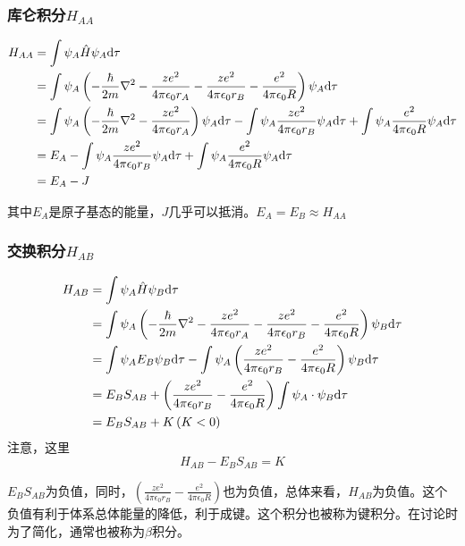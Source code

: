 \subsubsection{库仑积分$H_{AA}$}

\begin{align*}
    H_{AA} &= \int \psi_A \hat{H} \psi_A \mathrm{d} \tau \\ 
    &= \int \psi_A \left( -\frac{\hbar}{2m} \nabla^2 - \frac{ze^2}{4\pi\epsilon_0r_A} - \frac{ze^2}{4\pi\epsilon_0r_B} -  \frac{e^2}{4\pi\epsilon_0R}  \right) \psi_A \mathrm{d} \tau \\
    &= \int \psi_A \left( -\frac{\hbar}{2m} \nabla^2 - \frac{ze^2}{4\pi\epsilon_0r_A} \right) \psi_A \mathrm{d} \tau  - \int \psi_A \frac{ze^2}{4\pi\epsilon_0r_B} \psi_A \mathrm{d} \tau + \int \psi_A  \frac{e^2}{4\pi\epsilon_0R} \psi_A \mathrm{d} \tau \\
    &= E_A - \int \psi_A \frac{ze^2}{4\pi\epsilon_0r_B} \psi_A \mathrm{d} \tau + \int \psi_A  \frac{e^2}{4\pi\epsilon_0R} \psi_A \mathrm{d} \tau \\
    &= E_A - J
\end{align*}

其中$E_A$是原子基态的能量，$J$几乎可以抵消。$E_A = E_B \approx H_{AA}$

\subsubsection{交换积分$H_{AB}$}

\begin{align*}
    H_{AB} &= \int \psi_A \hat{H} \psi_B \mathrm{d} \tau \\
    &= \int \psi_A \left( -\frac{\hbar}{2m} \nabla^2 - \frac{ze^2}{4\pi\epsilon_0r_A} - \frac{ze^2}{4\pi\epsilon_0r_B} -  \frac{e^2}{4\pi\epsilon_0R}  \right) \psi_B \mathrm{d} \tau \\
    &= \int \psi_A E_B \psi_B \mathrm{d} \tau - \int \psi_A \left(\frac{ze^2}{4\pi\epsilon_0r_B} - \frac{e^2}{4\pi\epsilon_0R} \right) \psi_B \mathrm{d} \tau \\
    &= E_BS_{AB} +  \left(\frac{ze^2}{4\pi\epsilon_0r_B} - \frac{e^2}{4\pi\epsilon_0R} \right) \int \psi_A \cdot \psi_B \mathrm{d} \tau \\
    &= E_BS_{AB} + K \left( K < 0 \right) \\
\end{align*}
注意，这里
\begin{equation*}
    H_{AB} - E_BS_{AB} = K 
\end{equation*}

$E_BS_{AB}$为负值，同时，$\left(\frac{ze^2}{4\pi\epsilon_0r_B} - \frac{e^2}{4\pi\epsilon_0R} \right)$也为负值，总体来看，$H_{AB}$为负值。这个负值有利于体系总体能量的降低，利于成键。这个积分也被称为键积分。在讨论时为了简化，通常也被称为$\beta$积分。


